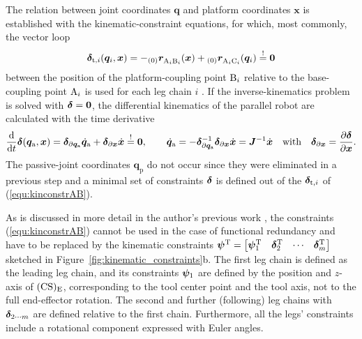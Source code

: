 %

The relation between joint coordinates $\bm{q}$ and platform coordinates $\bm{x}$ is established with the kinematic-constraint equations, for which, most commonly, the vector loop 
\begin{equation}
  \vecRes_{\mathrm{t},i}(\bm{q}_i,\bm{x}) %
  = 
  - \ortvek{0}{r}{}{\point{A}_i\point{B}_i}(\bm{x}) + \ortvek{0}{r}{}{\point{A}_i\point{C}_i}(\bm{q}_i)
  \overset{!}{=}\vec{0}	
  \label{equ:kinconstrAB}
\end{equation}
between the position of the platform-coupling point $\mathrm{B}_i$ relative to the base-coupling point $\mathrm{A}_i$ is used for each leg chain $i$ \cite{Merlet2006}. If the inverse-kinematics problem is solved with $\boldsymbol{\delta}=\bm{0}$, the differential kinematics of the parallel robot are calculated with the time derivative
\begin{equation}
  \frac{\mathrm{d}}{\mathrm{d}t} \boldsymbol{\delta}(\bm{q}_\mathrm{a},\bm{x})
  =
  \boldsymbol{\delta}_{\partial \bm{q}_\mathrm{a}} \dot{\bm{q}}_\mathrm{a}
  +
  \boldsymbol{\delta}_{\partial \bm{x}} \dot{\bm{x}}
  \overset{!}{=}
  \bm{0}, \quad \quad
  \dot{\boldsymbol{q}}_\mathrm{a}=-\boldsymbol{\delta}_{\partial \bm{q}_\mathrm{a}}^{-1} \boldsymbol{\delta}_{\partial \bm{x}}\dot{\bm{x}} = {\bm{J}}^{-1}\dot{\bm{x}}
  \quad
  \text{with}
  \quad
  \boldsymbol{\delta}_{\partial \bm{x}}=\frac{\partial \boldsymbol{\delta}}{\partial \bm{x}}.
  \label{equ:constr_qa_diff}
\end{equation}
The %
%
passive-joint coordinates $\bm{q}_{\mathrm{p}}$ do not occur since they were eliminated in a previous step and a minimal set of constraints $\boldsymbol{\delta}$ is defined out of the $\boldsymbol{\delta}_{\mathrm{t},i}$ of (\ref{equ:kinconstrAB}).

%

As is discussed in more detail in the author's previous work \cite{SchapplerTapOrt2019c}, the constraints (\ref{equ:kinconstrAB}) cannot be used in the case of functional redundancy and have to be replaced by the kinematic constraints $\boldsymbol{\psi}^{\mathrm{T}}
=
\begin{bmatrix}
  \boldsymbol{\psi}_1^{\mathrm{T}} &
  \boldsymbol{\delta}_2^{\mathrm{T}} &
  \cdots &
  \boldsymbol{\delta}_m^{\mathrm{T}}
\end{bmatrix}$
sketched in Figure~\ref{fig:kinematic_constraints}b.
The first leg chain is defined as the leading leg chain, and its constraints $\boldsymbol{\psi}_1$ are defined by the position and $z$-axis of $(\mathrm{CS})_{\mathrm{E}}$, corresponding to the tool center point and the tool axis, not to the full end-effector rotation. %
The second and further (following) leg chains with $\boldsymbol{\delta}_{2 \cdots m}$ are defined relative to the first chain.
Furthermore, all the legs' constraints include a rotational component expressed with Euler angles.

